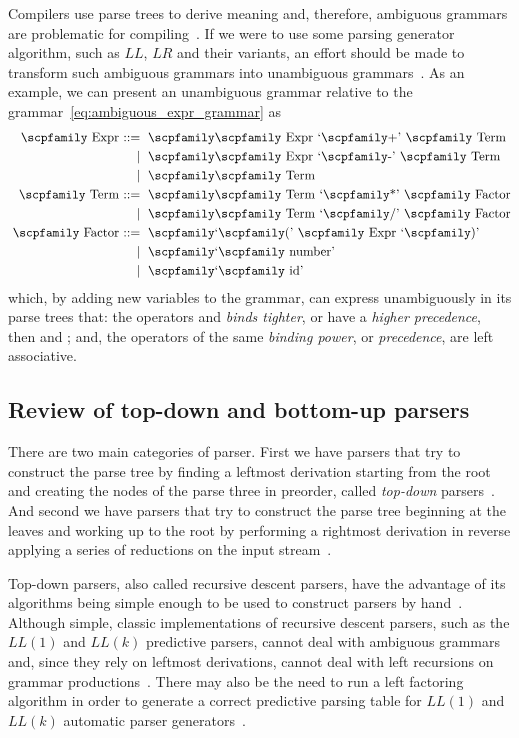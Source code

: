 \documentclass[
  oneside,
  english,
  coorientadorbanca,
  noabntexcite
]{ufsc-thesis-rn46-2019}
\def\bnfdef{::=}
\newcommand{\codett}[1]{\text{\scpfamily#1}}
\newcommand{\code}[1]{\text{\scpfamily\setlength\spaceskip{0.35em}#1}}
\newcommand{\bnfvar}[1]{\codett{#1}}
\newcommand{\bnfter}[1]{\textrm{`}\codett{#1}\textrm{'}}
\newcommand{\bnfprod}[2]{\bnfvar{#1} & \ & \bnfdef{} & \ \code{#2}}
\newcommand{\bnfmore}[1]{            & \ & \mid{}    & \ \code{#1}}
\begin{document}
Compilers use parse trees to derive meaning and, therefore, ambiguous grammars are problematic for compiling~\cite{appel2003modern}.
If we were to use some parsing generator algorithm, such as $LL$, $LR$ and their variants, an effort should be made to transform such ambiguous grammars into unambiguous grammars~\cite{appel2003modern}.
As an example, we can present an unambiguous grammar relative to the grammar~\eqref{eq:ambiguous_expr_grammar} as
\begin{equation}~\label{eq:unambiguous_expr_grammar}
  \begin{alignedat}{2}
    \bnfprod{Expr}{\bnfvar{Expr} \bnfter{+} \bnfvar{Term}} \\
    \bnfmore{\bnfvar{Expr} \bnfter{-} \bnfvar{Term}} \\
    \bnfmore{\bnfvar{Term}} \\
    \bnfprod{Term}{\bnfvar{Term} \bnfter{*} \bnfvar{Factor}} \\
    \bnfmore{\bnfvar{Term} \bnfter{/} \bnfvar{Factor}} \\
    \bnfprod{Factor}{\bnfter{(} \bnfvar{Expr} \bnfter{)}} \\
    \bnfmore{\bnfter{number}} \\
    \bnfmore{\bnfter{id}}
  \end{alignedat}
\end{equation}
which, by adding new variables to the grammar, can express unambiguously in its parse trees that: the operators \codett{*} and \codett{/} \textit{binds tighter}, or have a \textit{higher precedence}, then \codett{+} and \codett{-}; and, the operators of the same \textit{binding power}, or \textit{precedence}, are left associative.

\subsection{Review of top-down and bottom-up parsers}
There are two main categories of parser.
First we have parsers that try to construct the parse tree by finding a leftmost derivation starting from the root and creating the nodes of the parse three in preorder, called \textit{top-down} parsers~\cite{Aho:2006:CPT:1177220}.
And second we have parsers that try to construct the parse tree beginning at the leaves and working up to the root by performing a rightmost derivation in reverse applying a series of reductions on the input stream~\cite{Aho:2006:CPT:1177220}.

Top-down parsers, also called recursive descent parsers, have the advantage of its algorithms being simple enough to be used to construct parsers by hand~\cite{appel2003modern}.
Although simple, classic implementations of recursive descent parsers, such as the $LL(1)$ and $LL(k)$ predictive parsers, cannot deal with ambiguous grammars and, since they rely on leftmost derivations, cannot deal with left recursions on grammar productions~\cite{Aho:2006:CPT:1177220}.
There may also be the need to run a left factoring algorithm in order to generate a correct predictive parsing table for $LL(1)$ and $LL(k)$ automatic parser generators~\cite{Aho:2006:CPT:1177220}.
\end{document}
